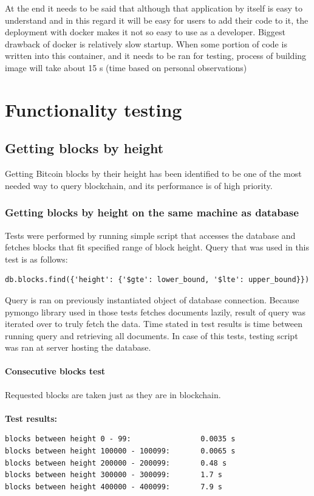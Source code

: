 \documentclass[12pt, en, eng, oneside, final]{mgr}
\begin{document}
At the end it needs to be said that although that application by itself is easy to understand and in this regard it will be easy for users to add their code to it, the deployment with docker makes it not so easy to use as a developer. Biggest drawback of docker is relatively slow startup. When some portion of code is written into this container, and it needs to be ran for testing, process of building image will take about 15 s (time based on personal observations) 

\chapter{Functionality testing}

\section{Getting blocks by height}
Getting Bitcoin blocks by their height has been identified to be one of the most needed way to query blockchain, and its performance is of high priority.

 
\subsection{Getting blocks by height on the same machine as database} 
Tests were performed by running simple script that accesses the database and fetches blocks that fit specified range of block height. Query that was used in this test is as follows: 
\begin{verbatim}
db.blocks.find({'height': {'$gte': lower_bound, '$lte': upper_bound}})
\end{verbatim}
Query is ran on previously instantiated object of database connection. Because pymongo library used in those tests fetches documents lazily, result of query was iterated over to truly fetch the data. Time stated in test results is time between running query and retrieving all documents. In case of this tests, testing script was ran at server hosting the database.

\subsubsection{Consecutive blocks test}
Requested blocks are taken just as they are in blockchain.
\\
\\
\textbf{Test results:}
\begin{verbatim}
blocks between height 0 - 99:                0.0035 s
blocks between height 100000 - 100099:       0.0065 s
blocks between height 200000 - 200099:       0.48 s
blocks between height 300000 - 300099:       1.7 s
blocks between height 400000 - 400099:       7.9 s
\end{verbatim}
\end{document}
